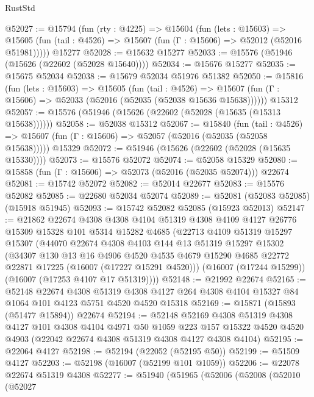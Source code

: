 \begin{lexlean}{RustStd}
\begin{coremodule}
@52027 := @15794
    (fun (rty : @4225) =>
    @15604
      (fun (lets : @15603) =>
      @15605 (fun (tail : @4526) => @15607 (fun (Γ : @15606) => @52012 (@52016 @51981)))))
    @15277
@52028 := @15632 @15277
@52033 := @15576 (@51946 (@15626 (@22602 (@52028 @15640))))
@52034 := @15676 @15277
@52035 := @15675 @52034
@52038 := @15679 @52034 @51976 @51382
@52050 := @15816
    (fun (lets : @15603) =>
    @15605
      (fun (tail : @4526) =>
      @15607 (fun (Γ : @15606) => @52033 (@52016 (@52035 (@52038 @15636 @15638))))))
    @15312
@52057 := @15576 (@51946 (@15626 (@22602 (@52028 (@15635 (@15313 @15638))))))
@52058 := @52038 @15312
@52067 := @15840
    (fun (tail : @4526) => @15607 (fun (Γ : @15606) => @52057 (@52016 (@52035 (@52058 @15638)))))
    @15329
@52072 := @51946 (@15626 (@22602 (@52028 (@15635 @15330))))
@52073 := @15576 @52072
@52074 := @52058 @15329
@52080 := @15858 (fun (Γ : @15606) => @52073 (@52016 (@52035 @52074))) @22674
@52081 := @15742 @52072
@52082 := @52014 @22677
@52083 := @15576 @52082
@52085 := @22680 @52034 @52074
@52089 := @52081 (@52083 @52085) (@15918 @51945)
@52093 := @15742 @52082 @52085 (@15923 @52013)
@52147 := @21862
    @22674
    @4308
    @4308
    @4104
    @51319
    @4308
    @4109
    @4127
    @26776
    @15309
    @15328
    @101
    @5314
    @15282
    @4685
    (@22713
      @4109
      @51319
      @15297
      @15307
      (@44070
        @22674
        @4308
        @4103
        @144
        @13
        @51319
        @15297
        @15302
        (@34307
          @130
          @13
          @16
          @4906
          @4520
          @4535
          @4679
          @15290
          @4685
          @22772
          @22871
          @17225
          (@16007 (@17227 @15291 @4520)))
        (@16007 (@17244 @15299))
        (@16007 (@17253 @4107 @17 @51319))))
@52148 := @21992 @22674
@52165 := @52148
    @22674
    @4308
    @51319
    @4308
    @4127
    @264
    @4308
    @4104
    @15327
    @84
    @1064
    @101
    @4123
    @5751
    @4520
    @4520
    @15318
@52169 := @15871 (@15893 (@51477 @15894)) @22674
@52194 := @52148
    @52169
    @4308
    @51319
    @4308
    @4127
    @101
    @4308
    @4104
    @4971
    @50
    @1059
    @223
    @157
    @15322
    @4520
    @4520
    @4903
    (@22042 @22674 @4308 @51319 @4308 @4127 @4308 @4104)
@52195 := @22064 @4127
@52198 := @52194 (@22052 (@52195 @50))
@52199 := @51509 @4127
@52203 := @52198 (@16007 (@52199 @101 @1059))
@52206 := @22078 @22674 @51319 @4308
@52277 := @51940
    (@51965
      (@52006
        (@52008
          (@52010
            (@52027

\end{coremodule}
\end{lexlean}
